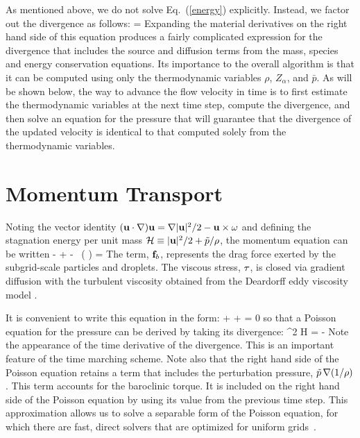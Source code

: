 As mentioned above, we do not solve Eq.~(\ref{energy}) explicitly. Instead, we factor out the divergence as follows:
\be
\label{eqn_simplediv1}
\Div{} =  
\ee
Expanding the material derivatives on the right hand side of this equation produces a fairly complicated expression for
the divergence that includes the source and diffusion terms from the mass, species and energy conservation equations.
Its importance to the overall algorithm is that it can be computed using only the
thermodynamic variables $\rho$, $Z_\alpha$, and $\bar{p}$. As will be shown below, the way to advance the flow velocity in time
is to first estimate the thermodynamic variables at the next time step, compute the divergence, and then solve an equation
for the pressure that will guarantee that the divergence of the updated velocity is identical to that computed solely from
the thermodynamic variables.



\section{Momentum Transport}

Noting the vector identity $({\bf u} \cdot \nabla) {\bf u} = \nabla|{\bf u}|^2/2 - {\bf u}\times{\bf \omega} $ and defining the stagnation energy per unit mass ${\cal H} \equiv |{\bf u}|^2/2 + \tilde{p}/\rho$, the momentum equation can be written
\be {} - \bu\times\bo +  - \tp \, \nabla \left( \right) =    \ee
The term, ${\bf f}_b$, represents the drag force exerted by the subgrid-scale particles and droplets. The viscous stress, ${\bf \tau}$, is closed via gradient diffusion with the turbulent viscosity obtained from the Deardorff eddy viscosity model \cite{Deardorff:1980,Pope:2000}.

It is convenient to write this equation in the form:
\be {} + \bF + \nabla \cH = 0  \ee
so that a Poisson equation for the pressure can be derived by taking its divergence:
\be \nabla^2 {\cal H} = -    \label{simplephi2} \ee
Note the appearance of the time derivative of the divergence. This is an important feature of the time marching scheme. Note also that the right hand side of the Poisson equation retains a term that includes the perturbation pressure, $\tilde{p} \, \nabla (1/\rho)$. This term accounts for the baroclinic torque. It is included on the right hand side of the Poisson equation by using its value from the previous time step. This approximation allows us to solve a separable form of the Poisson equation, for which there are fast, direct solvers that are optimized for uniform grids~\cite{Sweet:1}.

